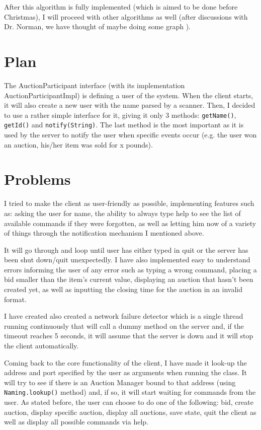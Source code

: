\documentclass[11pt]{article}
\begin{document}
 After this algorithm is fully implemented (which is aimed to be done before Christmas), I will proceed with other algorithms as well (after discussions with Dr. Norman, we have thought of maybe doing some graph ). 
 
 \section{Plan}
 The AuctionParticipant interface (with its implementation AuctionParticipantImpl) is defining a user of the system. When the client starts, it will also create a new user with the name parsed by a scanner. Then, I decided to use a rather simple interface for it, giving it only 3 methods: \texttt{getName()}, \texttt{getId()} and \texttt{notify(String)}. The last method is the most important as it is used by the server to notify the user when specific events occur (e.g. the user won an auction, his/her item was sold for x pounds).
 
\section{Problems}
 I tried to make the client as user-friendly as possible, implementing features such as: asking the user for name, the ability to always type help to see the list of available commands if they were forgotten, as well as letting him now of a variety of things through the notification mechanism I mentioned above.
 
 It will go through and loop until user has either typed in quit or the server has been shut down/quit unexpectedly. I have also implemented easy to understand errors informing the user of any error such as typing a wrong command, placing a bid smaller than the item's current value, displaying an auction that hasn't been created yet, as well as inputting the closing time for the auction in an invalid format.
 
 I have created also created a network failure detector which is a single thread running continuously that will call a dummy method on the server and, if the timeout reaches 5 seconds, it will assume that the server is down and it will stop the client automatically.
 
 Coming back to the core functionality of the client, I have made it look-up the address and port specified by the user as arguments when running the class. It will try to see if there is an Auction Manager bound to that address (using \texttt{Naming.lookup()} method) and, if so, it will start waiting for commands from the user. As stated before, the user can choose to do one of the following: bid, create auction, display specific auction, display all auctions, save state, quit the client as well as display all possible commands via help.
\end{document}
